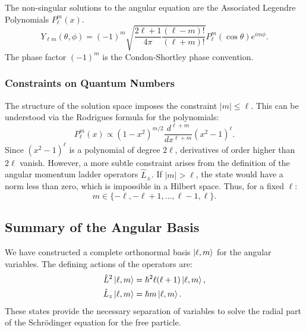 The non-singular solutions to the angular equation are the Associated Legendre
Polynomials $P_\ell^m(x)$.
\begin{equation}
  Y_{\ell m}(\theta, \phi) = (-1)^m \sqrt{\frac{2\ell+1}{4\pi}
  \frac{(\ell-m)!}{(\ell+m)!}} P_\ell^m(\cos\theta) e^{im\phi}.
\end{equation}
The phase factor $(-1)^m$ is the Condon-Shortley phase convention.

\subsubsection{Constraints on Quantum Numbers}
The structure of the solution space imposes the constraint $|m| \le \ell$. This
can be understood via the Rodrigues formula for the polynomials:
\begin{equation}
  P_\ell^m(x) \propto (1-x^2)^{m/2} \frac{d^{\ell+m}}{dx^{\ell+m}}
  (x^2-1)^\ell.
\end{equation}
Since $(x^2-1)^\ell$ is a polynomial of degree $2\ell$, derivatives of order
higher than $2\ell$ vanish. However, a more subtle constraint arises from the
definition of the angular momentum ladder operators $\hat{L}_\pm$. If $|m| >
\ell$, the state would have a norm less than zero, which is impossible in a
Hilbert space. Thus, for a fixed $\ell$:
\begin{equation}
  m \in \{-\ell, -\ell+1, \dots, \ell-1, \ell\}.
\end{equation}

\subsection{Summary of the Angular Basis}

We have constructed a complete orthonormal basis $\ket{\ell, m}$ for the angular
variables. The defining actions of the operators are:
\begin{align}
  \hat{L}^2 \ket{\ell, m} &= \hbar^2 \ell(\ell+1) \ket{\ell, m}, \\
  \hat{L}_z \ket{\ell, m} &= \hbar m \ket{\ell, m}.
\end{align}
These states provide the necessary separation of variables to solve the radial
part of the Schrödinger equation for the free particle.
